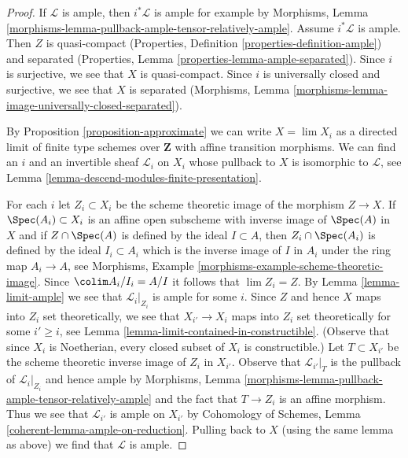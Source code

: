 \begin{proof}
If $\mathcal{L}$ is ample, then $i^*\mathcal{L}$ is ample for
example by Morphisms, Lemma
\ref{morphisms-lemma-pullback-ample-tensor-relatively-ample}.
Assume $i^*\mathcal{L}$ is ample. Then $Z$ is quasi-compact
(Properties, Definition \ref{properties-definition-ample})
and separated
(Properties, Lemma \ref{properties-lemma-ample-separated}).
Since $i$ is surjective, we see that $X$ is quasi-compact.
Since $i$ is universally closed and surjective, we see that
$X$ is separated (Morphisms, Lemma
\ref{morphisms-lemma-image-universally-closed-separated}).

\medskip\noindent
By Proposition \ref{proposition-approximate} we can write
$X = \lim X_i$ as a directed limit of finite type schemes over $\mathbf{Z}$
with affine transition morphisms. We can find an $i$ and an invertible
sheaf $\mathcal{L}_i$ on $X_i$ whose pullback to $X$ is isomorphic to
$\mathcal{L}$, see Lemma \ref{lemma-descend-modules-finite-presentation}.

\medskip\noindent
For each $i$ let $Z_i \subset X_i$ be the scheme theoretic image
of the morphism $Z \to X$. If $\Spec(A_i) \subset X_i$ is an affine
open subscheme with inverse image of $\Spec(A)$ in $X$ and if
$Z \cap \Spec(A)$ is defined by the ideal $I \subset A$, then
$Z_i \cap \Spec(A_i)$ is defined by the ideal $I_i \subset A_i$
which is the inverse image of $I$ in $A_i$ under the ring map
$A_i \to A$, see
Morphisms, Example \ref{morphisms-example-scheme-theoretic-image}.
Since $\colim A_i/I_i = A/I$ it follows that $\lim Z_i = Z$.
By Lemma \ref{lemma-limit-ample} we see that $\mathcal{L}_i|_{Z_i}$
is ample for some $i$. Since $Z$ and hence $X$ maps into $Z_i$
set theoretically, we see that $X_{i'} \to X_i$ maps into $Z_i$
set theoretically for some $i' \geq i$, see
Lemma \ref{lemma-limit-contained-in-constructible}.
(Observe that since $X_i$ is Noetherian, every closed subset
of $X_i$ is constructible.) Let $T \subset X_{i'}$
be the scheme theoretic inverse image of $Z_i$ in $X_{i'}$.
Observe that $\mathcal{L}_{i'}|_T$ is the pullback
of $\mathcal{L}_i|_{Z_i}$ and hence ample by
Morphisms, Lemma \ref{morphisms-lemma-pullback-ample-tensor-relatively-ample}
and the fact that $T \to Z_i$ is an affine morphism.
Thus we see that $\mathcal{L}_{i'}$ is ample on $X_{i'}$
by Cohomology of Schemes, Lemma \ref{coherent-lemma-ample-on-reduction}.
Pulling back to $X$ (using the same lemma as above)
we find that $\mathcal{L}$ is ample.
\end{proof}

